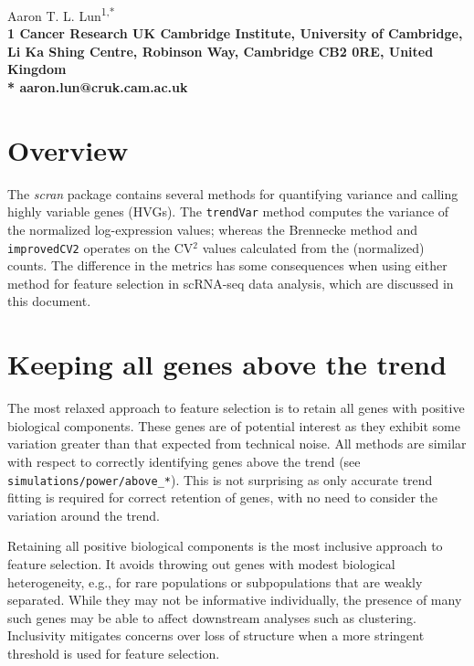 \documentclass{article}
\newcommand\code[1]{{\small\texttt{#1}}}
\begin{document}
\vspace*{0.35in}

\begin{flushleft}
{\Large
\textbf{}
}
\newline

Aaron T. L. Lun\textsuperscript{1,*}
\\
\bigskip
\bf{1} Cancer Research UK Cambridge Institute, University of Cambridge, Li Ka Shing Centre, Robinson Way, Cambridge CB2 0RE, United Kingdom
\\
\bigskip
* aaron.lun@cruk.cam.ac.uk

\end{flushleft}

\section{Overview}
The \textit{scran} package contains several methods for quantifying variance and calling highly variable genes (HVGs).
The \code{trendVar} method computes the variance of the normalized log-expression values;
whereas the Brennecke method and \code{improvedCV2} operates on the CV$^2$ values calculated from the (normalized) counts.
The difference in the metrics has some consequences when using either method for feature selection in scRNA-seq data analysis, which are discussed in this document.

\section{Keeping all genes above the trend}
The most relaxed approach to feature selection is to retain all genes with positive biological components.
These genes are of potential interest as they exhibit some variation greater than that expected from technical noise.
All methods are similar with respect to correctly identifying genes above the trend (see \texttt{simulations/power/above\_*}).
This is not surprising as only accurate trend fitting is required for correct retention of genes, with no need to consider the variation around the trend.

Retaining all positive biological components is the most inclusive approach to feature selection.
It avoids throwing out genes with modest biological heterogeneity, e.g., for rare populations or subpopulations that are weakly separated.
While they may not be informative individually, the presence of many such genes may be able to affect downstream analyses such as clustering.
Inclusivity mitigates concerns over loss of structure when a more stringent threshold is used for feature selection.
\end{document}
